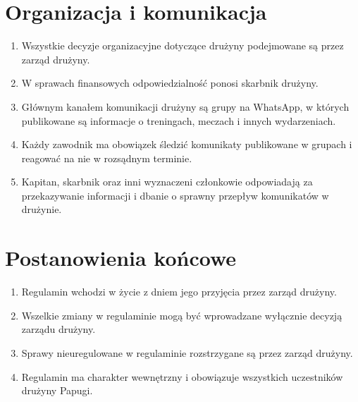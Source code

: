 \documentclass[12pt,a4paper]{article}
\let\stdsection\section
\renewcommand\section{\clearpage\stdsection}
\begin{document}
\section{Organizacja i komunikacja}
\begin{enumerate}
  \item Wszystkie decyzje organizacyjne dotyczące drużyny podejmowane są przez zarząd drużyny.
  \item W sprawach finansowych odpowiedzialność ponosi skarbnik drużyny.
  \item Głównym kanałem komunikacji drużyny są grupy na WhatsApp, w których publikowane są informacje o treningach, meczach i innych wydarzeniach.
  \item Każdy zawodnik ma obowiązek śledzić komunikaty publikowane w grupach i reagować na nie w rozsądnym terminie.
  \item Kapitan, skarbnik oraz inni wyznaczeni członkowie odpowiadają za przekazywanie informacji i dbanie o sprawny przepływ komunikatów w drużynie.
\end{enumerate}

\section{Postanowienia końcowe}
\begin{enumerate}
  \item Regulamin wchodzi w życie z dniem jego przyjęcia przez zarząd drużyny.
  \item Wszelkie zmiany w regulaminie mogą być wprowadzane wyłącznie decyzją zarządu drużyny.
  \item Sprawy nieuregulowane w regulaminie rozstrzygane są przez zarząd drużyny.
  \item Regulamin ma charakter wewnętrzny i obowiązuje wszystkich uczestników drużyny Papugi.
\end{enumerate}
\end{document}
